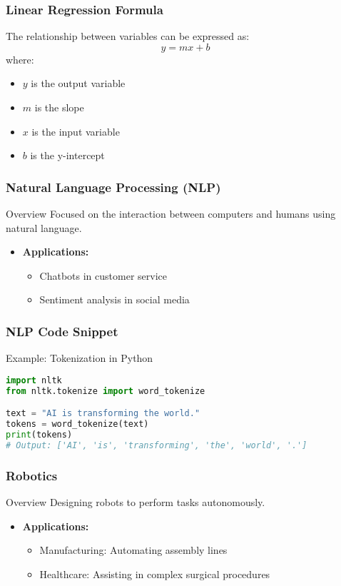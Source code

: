 \documentclass[aspectratio=169]{beamer}
\begin{document}
\begin{frame}[fragile]
    \frametitle{Linear Regression Formula}
    The relationship between variables can be expressed as:
    \begin{equation}
        y = mx + b
    \end{equation}
    where:
    \begin{itemize}
        \item $y$ is the output variable
        \item $m$ is the slope
        \item $x$ is the input variable
        \item $b$ is the y-intercept
    \end{itemize}
\end{frame}

\begin{frame}[fragile]
    \frametitle{Natural Language Processing (NLP)}
    \begin{block}{Overview}
        Focused on the interaction between computers and humans using natural language.
    \end{block}
    \begin{itemize}
        \item \textbf{Applications:}
        \begin{itemize}
            \item Chatbots in customer service
            \item Sentiment analysis in social media
        \end{itemize}
    \end{itemize}
\end{frame}

\begin{frame}[fragile]
    \frametitle{NLP Code Snippet}
    \begin{block}{Example: Tokenization in Python}
    \begin{lstlisting}[language=Python]
import nltk
from nltk.tokenize import word_tokenize

text = "AI is transforming the world."
tokens = word_tokenize(text)
print(tokens)
# Output: ['AI', 'is', 'transforming', 'the', 'world', '.']
    \end{lstlisting}
    \end{block}
\end{frame}

\begin{frame}[fragile]
    \frametitle{Robotics}
    \begin{block}{Overview}
        Designing robots to perform tasks autonomously.
    \end{block}
    \begin{itemize}
        \item \textbf{Applications:}
        \begin{itemize}
            \item Manufacturing: Automating assembly lines
            \item Healthcare: Assisting in complex surgical procedures
        \end{itemize}
    \end{itemize}
\end{frame}
\end{document}
